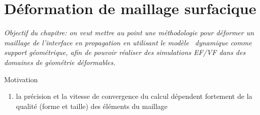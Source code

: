 \chapter{Déformation de maillage surfacique}

\textit{Objectif du chapitre: on veut mettre au point une méthodologie pour déformer un maillage de l'interface en propagation en utilisant le modèle \brep\ dynamique comme support géométrique, afin de pouvoir réaliser des simulations EF/VF dans des domaines de géométrie déformables.}

\par\bigskip

Motivation
\begin{enumerate}
	\item la précision et la vitesse de convergence du calcul dépendent fortement de la qualité (forme et taille) des éléments du maillage
\end{enumerate}


